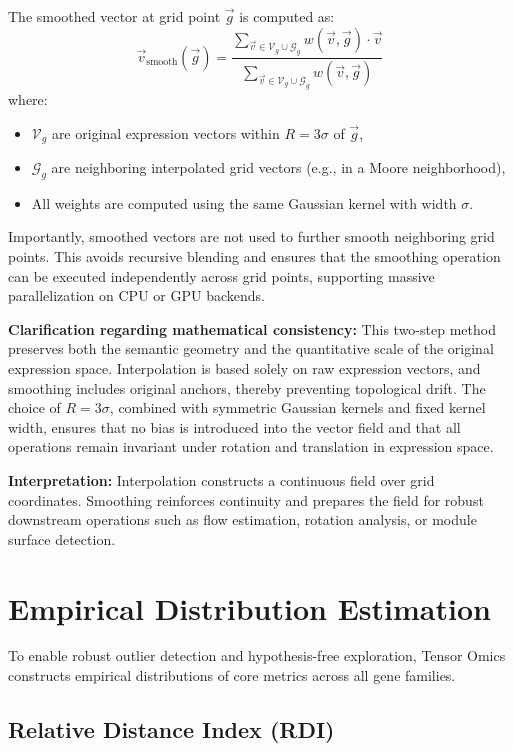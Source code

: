 \documentclass{article}
\begin{document}
The smoothed vector at grid point \( \vec{g} \) is computed as:
\[
\vec{v}_{\text{smooth}}(\vec{g}) = \frac{\sum_{\vec{v} \in \mathcal{V}_g \cup \mathcal{G}_g} w(\vec{v}, \vec{g}) \cdot \vec{v}}{\sum_{\vec{v} \in \mathcal{V}_g \cup \mathcal{G}_g} w(\vec{v}, \vec{g})}
\]
where:
\begin{itemize}
  \item \( \mathcal{V}_g \) are original expression vectors within \( R = 3\sigma \) of \( \vec{g} \),
  \item \( \mathcal{G}_g \) are neighboring interpolated grid vectors (e.g., in a Moore neighborhood),
  \item All weights are computed using the same Gaussian kernel with width \( \sigma \).
\end{itemize}

Importantly, smoothed vectors are not used to further smooth neighboring grid points. This avoids recursive blending and ensures that the smoothing operation can be executed independently across grid points, supporting massive parallelization on CPU or GPU backends.

\textbf{Clarification regarding mathematical consistency:} This two-step method preserves both the semantic geometry and the quantitative scale of the original expression space. Interpolation is based solely on raw expression vectors, and smoothing includes original anchors, thereby preventing topological drift. The choice of \( R = 3\sigma \), combined with symmetric Gaussian kernels and fixed kernel width, ensures that no bias is introduced into the vector field and that all operations remain invariant under rotation and translation in expression space.

\textbf{Interpretation:} Interpolation constructs a continuous field over grid coordinates. Smoothing reinforces continuity and prepares the field for robust downstream operations such as flow estimation, rotation analysis, or module surface detection.

\section{Empirical Distribution Estimation}
\label{sec:empirical_distribution}

To enable robust outlier detection and hypothesis-free exploration, Tensor Omics constructs empirical distributions of core metrics across all gene families.

\subsection{Relative Distance Index (RDI)}
\end{document}
